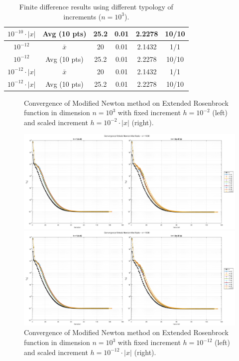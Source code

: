 \documentclass[a4paper,12pt]{article}
\begin{document}
\begin{itemize}
\begin{table}[H]
{\begin{tabular}{|c|c|c|c|c|c|}
					$10^{-10}\cdot|x|$ & Avg (10 pts) & 25.2 & 0.01 & 2.2278 & 10/10 \\
					\hline
					$10^{-12}$ & $\bar{x}$ & 20 & 0.01 & 2.1432 & 1/1 \\
					$10^{-12}$ & Avg (10 pts) & 25.2 & 0.01 & 2.2278 & 10/10 \\
					$10^{-12}\cdot|x|$ & $\bar{x}$ & 20 & 0.01 & 2.1432 & 1/1 \\
					$10^{-12}\cdot|x|$ & Avg (10 pts) & 25.2 & 0.01 & 2.2278 & 10/10 \\
					\hline
			\end{tabular}}%
			\caption{Finite difference results using different typology of increments ($n = 10^{3}$).}
			\label{tab:fd_ext_1000}
		\end{table}
		
		
			\begin{figure}[H]%
			\caption{Convergence of Modified Newton method on Extended Rosenbrock function in dimension $n = 10^{3}$ with fixed increment $h = 10^{-2}$ (left) and scaled increment $h = 10^{-2}\cdot|x|$ (right).}\label{fig:fd_1k_h2}
			\includegraphics[width=\textwidth]{../immagini/ext_1k_h2.png}
			
			\endminipage\hfill
			\caption{Convergence of Modified Newton method on Extended Rosenbrock function in dimension $n = 10^{3}$ with fixed increment $h = 10^{-12}$ (left) and scaled increment $h = 10^{-12}\cdot|x|$ (right).}\label{fig:fd_1k_h12}
			\includegraphics[width=\textwidth]{../immagini/ext_1k_h2.png}
			

\end{figure}
\end{itemize}
\end{document}
